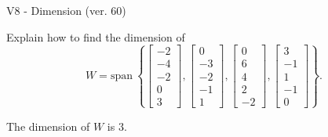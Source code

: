 \begin{exercise}
  \begin{exerciseTitle}V8 - Dimension (ver. 60)\end{exerciseTitle}
  \begin{exerciseStatement}
    Explain how to find the dimension of 
\[W=\mathrm{span}\ \left\{\left[\begin{array}{r}
-2 \\
-4 \\
-2 \\
0 \\
3
\end{array}\right] , \left[\begin{array}{r}
0 \\
-3 \\
-2 \\
-1 \\
1
\end{array}\right] , \left[\begin{array}{r}
0 \\
6 \\
4 \\
2 \\
-2
\end{array}\right] , \left[\begin{array}{r}
3 \\
-1 \\
1 \\
-1 \\
0
\end{array}\right]\right\}.\]



  \end{exerciseStatement}
  \begin{exerciseAnswer}
   The dimension of \(W\) is  \(3\).
  


  \end{exerciseAnswer}
\end{exercise}